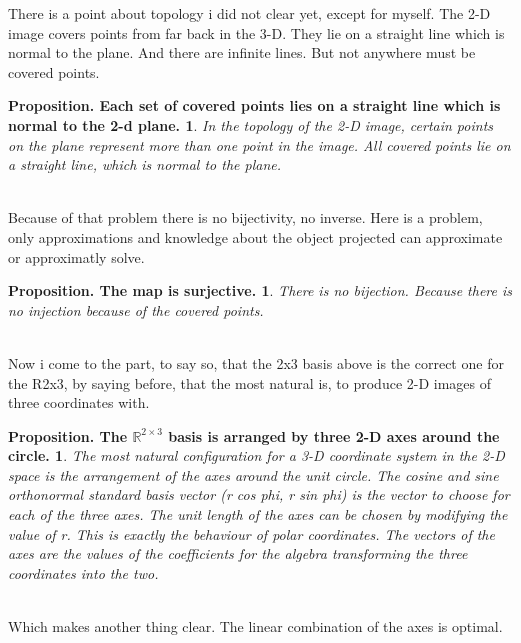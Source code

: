 \documentclass[a4paper]{article}
\begin{document}
There is a point about topology i did not clear yet, except for myself. The 2-D image covers points from far back in the 3-D.
They lie on a straight line which is normal to the plane. And there are infinite lines. But not anywhere must be covered points.\\

\newtheorem{PropositionB}{Proposition. Each set of covered points lies on a straight line which is normal to the 2-d plane.}
\begin{PropositionB}
In the topology of the 2-D image, certain points on the plane represent more than one point in the image. All covered points lie on a straight line, which is normal to the plane. 
\end{PropositionB}\\

Because of that problem there is no bijectivity, no inverse. Here is a problem, only approximations and knowledge about the object projected can approximate or approximatly solve.\\

\newtheorem{PropositionC}{Proposition. The map is surjective.}
\begin{PropositionC}
There is no bijection. Because there is no injection because of the covered points.
\end{PropositionC}\\

Now i come to the part, to say so, that the 2x3 basis above is the correct one for the R2x3, by saying before, that the most
natural is, to produce 2-D images of three coordinates with.\\

\newtheorem{PropositionD}{Proposition. The $\mathbb{R}^{2\times3}$ basis is arranged by three 2-D axes around the circle.}
\begin{PropositionD}
The most natural configuration for a 3-D coordinate system in the 2-D space is the arrangement of the axes around the unit circle.
The cosine and sine orthonormal standard basis vector (r cos phi, r sin phi) is the vector to choose for each of the three axes.
The unit length of the axes can be chosen by modifying the value of r. This is exactly the behaviour of polar coordinates. The vectors of the axes are the values of the coefficients for the algebra transforming the three coordinates into the two.
\end{PropositionD}\\

Which makes another thing clear. The linear combination of the axes is optimal.
\end{document}
